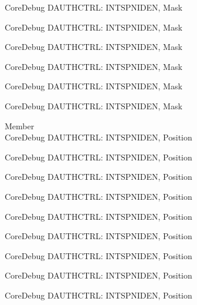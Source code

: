 \begin{DoxyRefList}
\label{deprecated__deprecated000875}%
%
Core\+Debug DAUTHCTRL\+: INTSPNIDEN, Mask 

\label{deprecated__deprecated000938}%
%
Core\+Debug DAUTHCTRL\+: INTSPNIDEN, Mask 

\label{deprecated__deprecated001017}%
%
Core\+Debug DAUTHCTRL\+: INTSPNIDEN, Mask 

\label{deprecated__deprecated001093}%
%
Core\+Debug DAUTHCTRL\+: INTSPNIDEN, Mask 

\label{deprecated__deprecated001196}%
%
Core\+Debug DAUTHCTRL\+: INTSPNIDEN, Mask 

\label{deprecated__deprecated001298}%
%
Core\+Debug DAUTHCTRL\+: INTSPNIDEN, Mask  
\item[Member \doxylink{group___c_m_s_i_s___s_c_b_gaf733a36e6b4717a604f7d77c05dfceb4}{Core\+Debug\+\_\+\+DAUTHCTRL\+\_\+\+INTSPNIDEN\+\_\+\+Pos} ]\hfill \\
\label{deprecated__deprecated000085}%
%
Core\+Debug DAUTHCTRL\+: INTSPNIDEN, Position 

\label{deprecated__deprecated000139}%
%
Core\+Debug DAUTHCTRL\+: INTSPNIDEN, Position 

\label{deprecated__deprecated000215}%
%
Core\+Debug DAUTHCTRL\+: INTSPNIDEN, Position 

\label{deprecated__deprecated000278}%
%
Core\+Debug DAUTHCTRL\+: INTSPNIDEN, Position 

\label{deprecated__deprecated000357}%
%
Core\+Debug DAUTHCTRL\+: INTSPNIDEN, Position 

\label{deprecated__deprecated000433}%
%
Core\+Debug DAUTHCTRL\+: INTSPNIDEN, Position 

\label{deprecated__deprecated000536}%
%
Core\+Debug DAUTHCTRL\+: INTSPNIDEN, Position 

\label{deprecated__deprecated000638}%
%
Core\+Debug DAUTHCTRL\+: INTSPNIDEN, Position 

\label{deprecated__deprecated000744}%
%
Core\+Debug DAUTHCTRL\+: INTSPNIDEN, Position 


\end{DoxyRefList}
